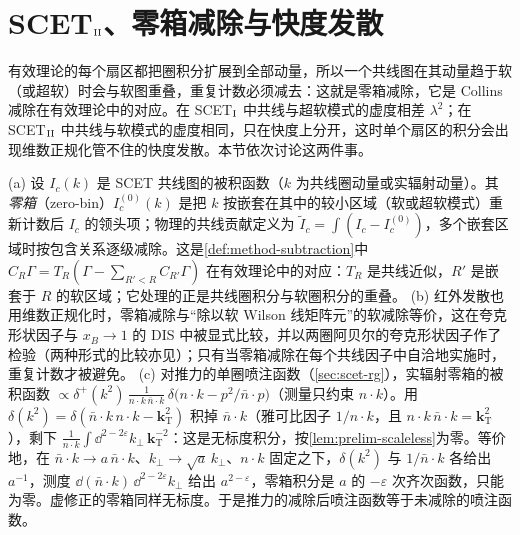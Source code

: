 \section{SCET\texorpdfstring{$_{\rm II}$}{II}、零箱减除与快度发散}\label{sec:scet-scet2}

有效理论的每个扇区都把圈积分扩展到全部动量，所以一个共线图在其动量趋于软（或超软）时会与软图重叠，重复计数必须减去：这就是零箱减除，它是 Collins 减除在有效理论中的对应。在 SCET$_{\rm I}$ 中共线与超软模式的虚度相差 $\lambda^2$；在 SCET$_{\rm II}$ 中共线与软模式的虚度相同，只在快度上分开，这时单个扇区的积分会出现维数正规化管不住的快度发散。本节依次讨论这两件事。

\begin{definition}[零箱减除]\label{def:scet-zero-bin}
(a) 设 $I_c(k)$ 是 SCET 共线图的被积函数（$k$ 为共线圈动量或实辐射动量）。其\emph{零箱}（zero-bin）$I_c^{(0)}(k)$ 是把 $k$ 按嵌套在其中的较小区域（软或超软模式）重新计数后 $I_c$ 的领头项；物理的共线贡献定义为 $\tilde I_c=\int(I_c-I_c^{(0)})$，多个嵌套区域时按包含关系逐级减除\cite{ManoharStewart2007}。这是\cref{def:method-subtraction}中 $C_R\Gamma=T_R(\Gamma-\sum_{R'<R}C_{R'}\Gamma)$ 在有效理论中的对应：$T_R$ 是共线近似，$R'$ 是嵌套于 $R$ 的软区域；它处理的正是共线圈积分与软圈积分的重叠。
(b) 红外发散也用维数正规化时，零箱减除与“除以软 Wilson 线矩阵元”的软减除等价，这在夸克形状因子与 $x_B\to1$ 的 DIS 中被显式比较，并以两圈阿贝尔的夸克形状因子作了检验\cite{IdilbiMehen2007}（两种形式的比较亦见\cite{Lee:2006nr}）；只有当零箱减除在每个共线因子中自洽地实施时，重复计数才被避免。
(c) 对推力的单圈喷注函数（\cref{sec:scet-rg}），实辐射零箱的被积函数 $\propto\delta^+(k^2)\,\frac{1}{n\cdot k\,\bar n\cdot k}\,\delta\big(n\cdot k-p^2/\bar n\cdot p\big)$（测量只约束 $n\cdot k$）。用 $\delta(k^2)=\delta(\bar n\cdot k\,n\cdot k-\bm k_{\mathrm T}^2)$ 积掉 $\bar n\cdot k$（雅可比因子 $1/n\cdot k$，且 $n\cdot k\,\bar n\cdot k=\bm k_{\mathrm T}^2$），剩下 $\frac{1}{n\cdot k}\int\dd^{2-2\varepsilon}k_\perp\,\bm k_{\mathrm T}^{-2}$：这是无标度积分，按\cref{lem:prelim-scaleless}为零。等价地，在 $\bar n\cdot k\to a\,\bar n\cdot k$、$k_\perp\to\sqrt a\,k_\perp$、$n\cdot k$ 固定之下，$\delta(k^2)$ 与 $1/\bar n\cdot k$ 各给出 $a^{-1}$，测度 $\dd(\bar n\cdot k)\,\dd^{2-2\varepsilon}k_\perp$ 给出 $a^{2-\varepsilon}$，零箱积分是 $a$ 的 $-\varepsilon$ 次齐次函数，只能为零。虚修正的零箱同样无标度。于是推力的减除后喷注函数等于未减除的喷注函数。%
\end{definition}

